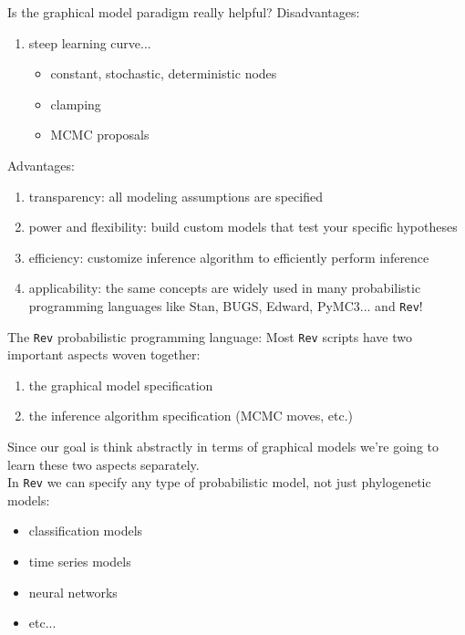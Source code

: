 \documentclass[mathserif]{beamer}
\begin{document}
\begin{frame}
    \begin{block}{Is the graphical model paradigm really helpful?}
    \bigskip
    \small
    Disadvantages: 
    \begin{enumerate}
        \item steep learning curve...
        \begin{itemize}
            \item constant, stochastic, deterministic nodes
            \item clamping
            \item MCMC proposals
        \end{itemize}
    \end{enumerate}
    Advantages: 
    \begin{enumerate}
        \item transparency: all modeling assumptions are specified
        \item power and flexibility: build custom models that test your specific hypotheses 
        \item efficiency: customize inference algorithm to efficiently perform inference 
        \item applicability: the same concepts are widely used in many probabilistic programming languages like Stan, BUGS, Edward, PyMC3... and \texttt{Rev}!
    \end{enumerate}
    \end{block}
\end{frame}


\begin{frame}

    \small
    \begin{block}{The \texttt{Rev} probabilistic programming language:}
    \bigskip
    Most \texttt{Rev} scripts have two important aspects woven together: 
    \begin{enumerate}
        \item the graphical model specification
        \item the inference algorithm specification (MCMC moves, etc.)
    \end{enumerate}
    Since our goal is think abstractly in terms of graphical models
     we're going to learn these two aspects separately. \\
     \bigskip
        In \texttt{Rev} we can specify any type of probabilistic model, not just phylogenetic models:
    \begin{itemize}
        \item classification models
        \item time series models
        \item neural networks
        \item etc...
    \end{itemize}
    \end{block}
\end{frame}
\end{document}
